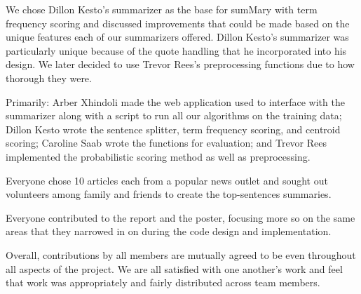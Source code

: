 \documentclass[11pt,a4paper]{article}
\begin{document}
  We chose Dillon Kesto's summarizer as the base for sumMary with term frequency scoring and discussed improvements that could be made based on the unique features each of our summarizers offered. Dillon Kesto's summarizer was particularly unique because of the quote handling that he incorporated into his design. We later decided to use Trevor Rees's preprocessing functions due to how thorough they were.

  Primarily: Arber Xhindoli made the web application used to interface with the summarizer along with a script to run all our algorithms on the training data; Dillon Kesto wrote the sentence splitter, term frequency scoring, and centroid scoring; Caroline Saab wrote the functions for evaluation; and Trevor Rees implemented the probabilistic scoring method as well as preprocessing.

  Everyone chose 10 articles each from a popular news outlet and sought out volunteers among family and friends to create the top-sentences summaries.

  Everyone contributed to the report and the poster, focusing more so on the same areas that they narrowed in on during the code design and implementation.

  Overall, contributions by all members are mutually agreed to be even throughout all aspects of the project. We are all satisfied with one another's work and feel that work was appropriately and fairly distributed across team members.



\end{document}
